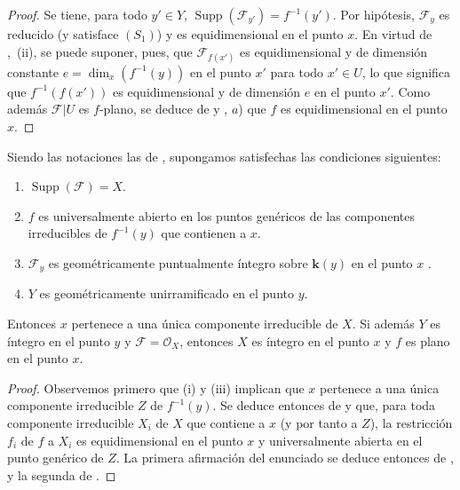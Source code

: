 \begin{proof}
\label{IV.15.3.2-proof}
Se tiene, para todo $y'\in Y$, $\operatorname{Supp}(\mathcal F_{y'})=f^{-1}(y')$.
Por hipótesis, $\mathcal F_y$ es reducido (y satisface $(S_1)$) y es equidimensional en el punto $x$.
En virtud de ,~(ii), se puede suponer, pues, que $\mathcal F_{f(x')}$ es equidimensional y de dimensión constante $e=\dim_x(f^{-1}(y))$ en el punto $x'$ para todo $x'\in U$, lo que significa que $f^{-1}(f(x'))$ es equidimensional y de dimensión $e$ en el punto $x'$.
Como además $\mathcal F|U$ es $f$-plano, se deduce de  y , $a$) que $f$ es equidimensional en el punto $x$.
\end{proof}

\begin{corollary}[15.3.3]
\label{IV.15.3.3}
Siendo las notaciones las de , supongamos satisfechas las condiciones siguientes:
\begin{enumerate}[label=\textup{(\roman*)}]
  \item $\operatorname{Supp}(\mathcal F)=X$.
  \item $f$ es universalmente abierto en los puntos genéricos de las componentes irreducibles de $f^{-1}(y)$ que contienen a $x$.
  \item $\mathcal F_y$ es geométricamente puntualmente íntegro sobre $\boldsymbol{k}(y)$ en el punto $x$ .
  \item $Y$ es geométricamente unirramificado en el punto $y$.
\end{enumerate}
Entonces $x$ pertenece a una única componente irreducible de $X$.
Si además $Y$ es íntegro en el punto $y$ y $\mathcal F=\mathcal O_X$, entonces $X$ es íntegro en el punto $x$ y $f$ es plano en el punto $x$.
\end{corollary}

\begin{proof}
\label{IV.15.3.3-proof}
Observemos primero que (i) y (iii) implican que $x$ pertenece a una única componente irreducible $Z$ de $f^{-1}(y)$.
Se deduce entonces de  y  que, para toda componente irreducible $X_i$ de $X$ que contiene a $x$ (y por tanto a $Z$), la restricción $f_i$ de $f$ a $X_i$ es equidimensional en el punto $x$ y universalmente abierta en el punto genérico de $Z$.
La primera afirmación del enunciado se deduce entonces de , y la segunda de .
\end{proof}

